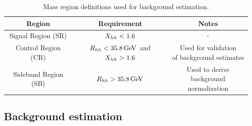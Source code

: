 \begin{table}[h!]
\centering
\captionsetup{justification=centering}

\hspace{-10pt}
\begin{tabular}{|c|c|c|}
\hline
Region & Requirement & Notes \\
\hline
Signal Region (SR) & $X_{hh} < 1.6$ & - \\ \hline
Control Region (CR) & $\Rhh < 35.8\GeV$ and $X_{hh} > 1.6$ & \specialcell{Used for validation\\of background estimates} \\ \hline
Sideband Region (SB) & $\Rhh > 35.8 \GeV$ & \specialcell{Used to derive\\background normalization} \\
\hline
\end{tabular}
\caption{
Mass region definitions used for background estimation.
}
\label{tab:MassRegions}
\end{table}

\subsection{Background estimation}

